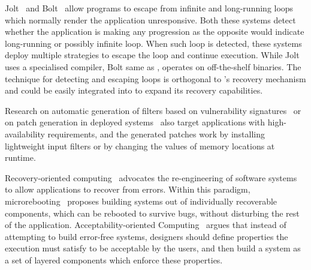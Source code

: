 Jolt~\cite{jolt} and Bolt~\cite{bolt} allow programs to escape from infinite
and long-running loops which normally render the application unresponsive. Both
these systems detect whether the application is making any progression as the
opposite would indicate long-running or possibly infinite loop. When such loop
is detected, these systems deploy multiple strategies to escape the loop and
continue execution.  While Jolt uses a specialised compiler, Bolt same as \mx,
operates on off-the-shelf binaries. The technique for detecting and escaping
loops is orthogonal to \mx's recovery mechanism and could be easily integrated
into \rem to expand its recovery capabilities.

Research on automatic generation of filters based on vulnerability
signatures~\cite{song:oakland06,vigilante} 
or on patch
generation in deployed systems~\cite{clearview}
also target applications with high-availability requirements, and the
generated patches work by installing lightweight input filters or by changing
the values of memory locations at runtime.

Recovery-oriented computing~\cite{roc} advocates the re-engineering of software
systems to allow applications to recover from errors. Within this paradigm,
microrebooting~\cite{microreboots} proposes building systems out of
individually recoverable components, which can be rebooted to survive bugs,
without disturbing the rest of the application. Acceptability-oriented
Computing~\cite{aoc:oopsla03} argues that instead of attempting to build
error-free systems, designers should define properties the execution must
satisfy to be acceptable by the users, and then build a system as a set of
layered components which enforce these properties.
